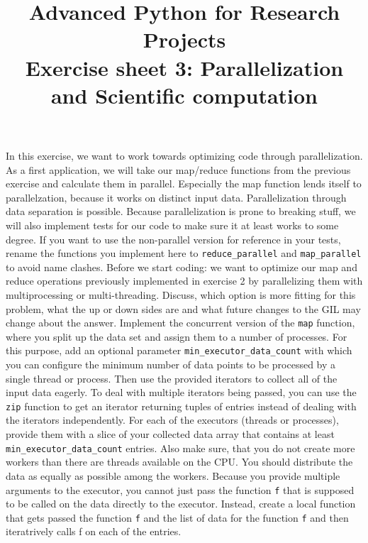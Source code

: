 \documentclass[]{erlangen-problemset}
\title{{\Large Advanced Python for Research Projects} \\[0.3cm] 
Exercise sheet 3: Parallelization and Scientific computation}
\begin{document}

\begin{problem}[title={Parallel operators}]
In this exercise, we want to work towards optimizing code through parallelization. As a first application, we will take our map/reduce functions from the previous exercise and calculate them in parallel. 
Especially the map function lends itself to parallelzation, because it works on distinct input data.
Parallelization through data separation is possible. Because parallelization is prone to breaking stuff, we will also implement tests for our code to make sure it at least works to some degree.
If you want to use the non-parallel version for reference in your tests, rename the functions you implement here to \texttt{reduce\_parallel} and \texttt{map\_parallel} to avoid name clashes.
\noindent
\Question Before we start coding: we want to optimize our map and reduce operations previously implemented in exercise 2 by parallelizing them with multiprocessing or multi-threading. 
Discuss, which option is more fitting for this problem, what the up or down sides are and what future changes to the GIL may change about the answer.
\Question Implement the concurrent version of the \texttt{map} function, where you split up the data set and assign them to a number of processes. 
For this purpose, add an optional parameter \texttt{min\_executor\_data\_count} with which you can configure the minimum number of data points to be processed by a single thread or process. 
Then use the provided iterators to collect all of the input data eagerly. To deal with multiple iterators being passed, you can use the \texttt{zip} function to get an iterator returning tuples of entries instead of dealing with the iterators independently.
For each of the executors (threads or processes), provide them with a slice of your collected data array that contains at least \texttt{min\_executor\_data\_count} entries.
Also make sure, that you do not create more workers than there are threads available on the CPU. 
You should distribute the data as equally as possible among the workers.
Because you provide multiple arguments to the executor, you cannot just pass the function \texttt{f} that is supposed to be called on the data directly to the executor.
Instead, create a local function that gets passed the function \texttt{f} and the list of data for the function \texttt{f} and then iteratrively calls f on each of the entries.

\end{problem}
\end{document}
